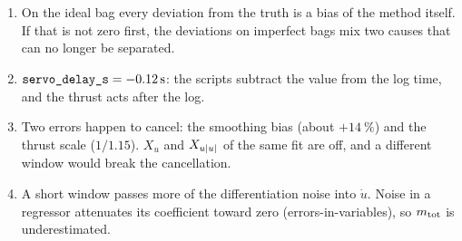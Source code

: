 \section*{}
\begin{enumerate}
  \item On the ideal bag every deviation from the truth is a bias of the method itself. If that is
        not zero first, the deviations on imperfect bags mix two causes that can no longer be
        separated.
  \item $\code{servo_delay_s} = \qty{-0.12}{\second}$: the scripts subtract the value from the log
        time, and the thrust acts after the log.
  \item Two errors happen to cancel: the smoothing bias (about $+\qty{14}{\percent}$) and the thrust
        scale ($1/1.15$). $X_u$ and $X_{u|u|}$ of the same fit are off, and a different window would
        break the cancellation.
  \item A short window passes more of the differentiation noise into $\dot u$. Noise in a
        regressor attenuates its coefficient toward zero (errors-in-variables), so $m_\mathrm{tot}$ is
        underestimated.
\end{enumerate}
